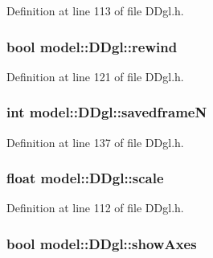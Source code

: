 Definition at line 113 of file D\+Dgl.\+h.

\hypertarget{structmodel_1_1_d_dgl_a4cd45fc7cf705db213ba02575f8d479e}{}
\subsubsection[{rewind}]{\setlength{\rightskip}{0pt plus 5cm}bool model\+::\+D\+Dgl\+::rewind}\label{structmodel_1_1_d_dgl_a4cd45fc7cf705db213ba02575f8d479e}


Definition at line 121 of file D\+Dgl.\+h.

\hypertarget{structmodel_1_1_d_dgl_a8bddc6ee4a239f82190220edce3a98af}{}
\subsubsection[{savedframe\+N}]{\setlength{\rightskip}{0pt plus 5cm}int model\+::\+D\+Dgl\+::savedframe\+N}\label{structmodel_1_1_d_dgl_a8bddc6ee4a239f82190220edce3a98af}


Definition at line 137 of file D\+Dgl.\+h.

\hypertarget{structmodel_1_1_d_dgl_a7f18f8a2d6cdba89dc759ca2bf2dea6b}{}
\subsubsection[{scale}]{\setlength{\rightskip}{0pt plus 5cm}float model\+::\+D\+Dgl\+::scale}\label{structmodel_1_1_d_dgl_a7f18f8a2d6cdba89dc759ca2bf2dea6b}


Definition at line 112 of file D\+Dgl.\+h.

\hypertarget{structmodel_1_1_d_dgl_abb563580ed3aea0576c99adc5291eae3}{}
\subsubsection[{show\+Axes}]{\setlength{\rightskip}{0pt plus 5cm}bool model\+::\+D\+Dgl\+::show\+Axes}\label{structmodel_1_1_d_dgl_abb563580ed3aea0576c99adc5291eae3}


